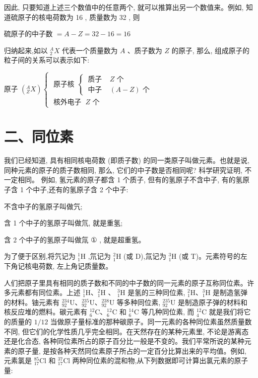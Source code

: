 \documentclass[10pt]{article}
\begin{document}
因此, 只要知道上述三个数值中的任意两个, 就可以推算出另一个数值来。例如, 知道硫原子的核电荷数为 16 , 质量数为 32 , 则

硫原子的中子数 \(= A - Z = {32} - {16} = {16}\)

归纳起来,如以 \({}_{2}^{A}X\) 代表一个质量数为 \(A\) 、质子数为 \(Z\) 的原子, 那么, 组成原子的粒子间的关系可以表示如下:

原子 \(\left( {{}_{Z}^{A}X}\right) \left\{ \begin{array}{l} \text{ 原子核 }\left\{ \begin{array}{ll} \text{ 质子 } & Z\text{ 个 } \\ \text{ 中子 } & \left( {A - Z}\right) \text{ 个 } \end{array}\right. \\ \text{ 核外电子 }\;Z\text{ 个 } \end{array}\right.\)

\section*{二、同位素}

我们已经知道, 具有相同核电荷数 (即质子数) 的同一类原子叫做元素。也就是说, 同种元素的原子的质子数相同, 那么, 它们的中子数是否相同呢? 科学研究证明, 不一定相同。 例如, 氢元素的原子都含 1 个质子, 但有的氢原子不含中子, 有的氢原子含 1 个中子,还有的氢原子含 2 个中子:

不含中子的氢原子叫做氕;

含 1 个中子的氢原子叫做氘, 就是重氢;

含 2 个中子的氢原子叫做氚 \(\text{①}\) , 就是超重氢。

为了便于区别,将氕记为 \({}_{1}^{1}\mathrm{H}\) ,氘记为 \({}_{1}^{2}\mathrm{H}\) (或 D),氚记为 \({}_{1}^{3}\mathrm{H}\) (或 T)。元素符号的左下角记核电荷数, 左上角记质量数。

人们把原子里具有相同的质子数和不同的中子数的同一元素的原子互称同位素。许多元素都有同位素。上述 \({}_{1}^{1}\mathrm{H}\text{、}{}_{1}^{2}\mathrm{H}\) 、 \({}_{1}^{3}\mathrm{H}\) 是氢的三种同位素, \({}_{1}^{2}\mathrm{H}\text{、}{}_{1}^{3}\mathrm{H}\) 是制造氢弹的材料。铀元素有 \({}_{92}^{234}\mathrm{U}\text{、}{}_{92}^{235}\mathrm{U}\text{、}{}_{92}^{238}\mathrm{U}\) 等多种同位素, \({}_{92}^{235}\mathrm{U}\) 是制造原子弹的材料和核反应堆的燃料。碳元素有 \({}_{6}^{12}\mathrm{C}\text{、}{}_{6}^{12}\mathrm{C}\) 和 \({}_{6}^{14}\mathrm{C}\) 等几种同位素, 而 \({}_{4}^{12}\mathrm{C}\) 就是我们将它的质量的 \(1/{12}\) 当做原子量标准的那种碳原子。同一元素的各种同位素虽然质量数不同, 但它们的化学性质几乎完全相同。在天然存在的某种元素里, 不论是游离态还是化合态, 各种同位素所占的原子百分比一般是不变的。我们平常所说的某种元素的原子量, 是按各种天然同位素原子所占的一定百分比算出来的平均值。例如, 元素氯是 \({}_{17}^{85}\mathrm{{Cl}}\) 和 \({}_{17}^{37}\mathrm{{Cl}}\) 两种同位素的混和物,从下列数据即可计算出氯元素的原子量:
\end{document}
